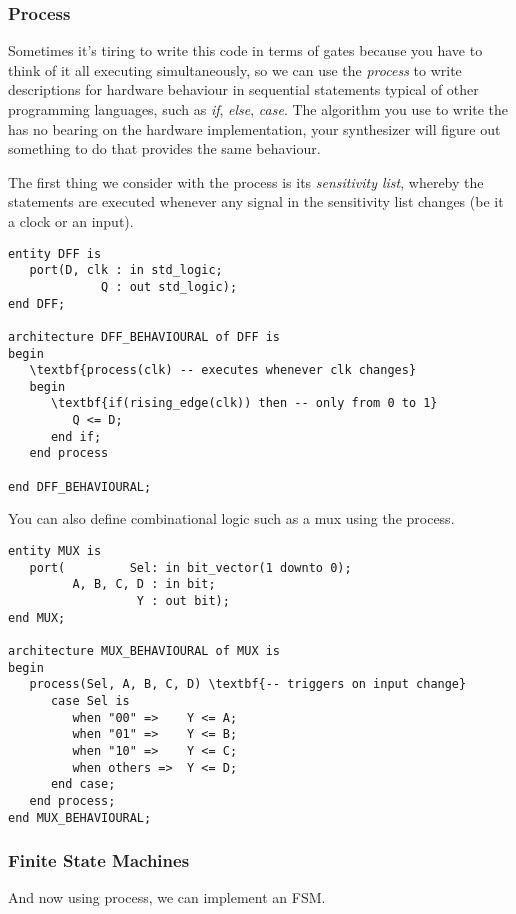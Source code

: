 \documentclass{IEEEtran}
\begin{document}
\subsubsection{Process}Sometimes it's tiring to write this code in terms of gates because you have to think of it all executing simultaneously, so we can use the \textit{process} to write descriptions for hardware behaviour in sequential statements typical of other programming languages, such as \textit{if}, \textit{else}, \textit{case}. The algorithm you use to write the has no bearing on the hardware implementation, your synthesizer will figure out something to do that provides the same behaviour.

The first thing we consider with the process is its \textit{sensitivity list}, whereby the statements are executed whenever any signal in the sensitivity list changes (be it a clock or an input). 

\begin{Verbatim}[fontsize=\scriptsize, xleftmargin=.3in, commandchars=\\\{\}]
entity DFF is
   port(D, clk : in std_logic;
             Q : out std_logic);
end DFF;

architecture DFF_BEHAVIOURAL of DFF is 
begin 
   \textbf{process(clk) -- executes whenever clk changes}
   begin
      \textbf{if(rising_edge(clk)) then -- only from 0 to 1}
         Q <= D;
      end if;
   end process

end DFF_BEHAVIOURAL;
\end{Verbatim}

You can also define combinational logic such as a mux using the process. 

\begin{Verbatim}[fontsize=\scriptsize, xleftmargin=.3in, commandchars=\\\{\}]
entity MUX is 
   port(         Sel: in bit_vector(1 downto 0);
         A, B, C, D : in bit;
                  Y : out bit);
end MUX;
                  
architecture MUX_BEHAVIOURAL of MUX is
begin
   process(Sel, A, B, C, D) \textbf{-- triggers on input change}
      case Sel is 
         when "00" =>    Y <= A;
         when "01" =>    Y <= B;
         when "10" =>    Y <= C;
         when others =>  Y <= D;
      end case;        
   end process;
end MUX_BEHAVIOURAL;
\end{Verbatim}

\subsubsection{Finite State Machines} And now using process, we can implement an FSM.
\end{document}
